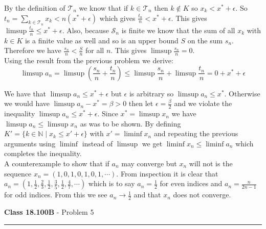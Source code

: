 \documentclass[11pt,reqno]{article}
\begin{document}
\indent By the definition of $\mathcal{T}_n$ we know that if $k \in \mathcal{T}_n$ then $k \notin K$ so $x_k < x^* + \epsilon$. So $t_ n = \sum_{k \in \mathcal{T}_n} x_k < n(x^* + \epsilon)$ 
which gives $\frac{t_n}{n} < x^* + \epsilon$. This gives $\limsup \frac{t_n}{n} \le x^* + \epsilon$. Also, because $\mathcal{S}_n$ is finite we know that the sum of all $x_k$ with $k \in K$ is a finite value as well and so is an upper bound $S$ on the sum $s_n$. Therefore we have $\frac{s_n}{n} < \frac{S}{n}$ for all $n$. This gives $\limsup \frac{s_n}{n} = 0$.\\
\indent Using the result from the previous problem we derive:
\begin{equation}
\limsup a_n = \limsup(\frac{s_n}{n} + \frac{t_n}{n}) \le  \limsup \frac{s_n}{n} +\limsup \frac{t_n}{n} = 0 + x^* + \epsilon
\end{equation}

We have that $\limsup a_n \le x^* + \epsilon$ but $\epsilon$ is arbitrary so $\limsup a_n \le x^*$. Otherwise we would have $\limsup a_n - x^* = \beta > 0$ then let $\epsilon = \frac{\beta}{2}$ and we violate the inequality  $\limsup a_n \le x^* + \epsilon$. Since $x^* = \limsup x_n$ we have $\limsup a_n \le \limsup x_n$ as was to be shown. By defining $K' = \{ k \in \mathbb{N} \; | \; x_k \le x' + \epsilon \}$ with $x' = \liminf x_n$ and repeating the previous arguments using $
\liminf$ instead of $\limsup$ we get $\liminf x_n \le \liminf a_n$ which completes the inequality.\\
\indent A counterexample to show that if $a_n$ may converge but $x_n$ will not is the sequence $x_n = (1,0,1,0,1,0,1,\cdots)$. From inspection it is clear that $a_n = (1,\frac{1}{2},\frac{2}{3},\frac{1}{2},\frac{3}{5},\frac{1}{2},\frac{4}{7},\cdots)$ which is to say $a_n = \frac{1}{2}$ for even indices and $a_n = \frac{n}{2n-1}$ for odd indices. From this we see $a_n \to \frac{1}{2}$ and that $x_n$ does not converge.

\vspace{15pt}
\begin{flushleft} 
\textbf{Class 18.100B} - Problem 5\\
\rule{500pt}{1pt}\\
\end{flushleft} 
\end{document}
